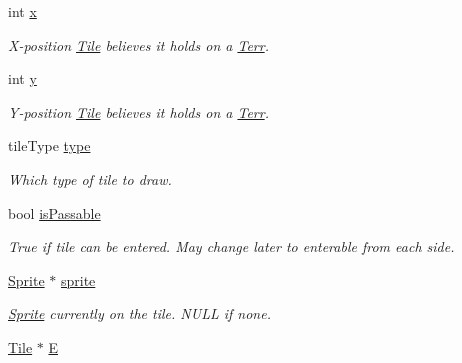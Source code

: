 \begin{DoxyCompactItemize}
\item 
int \hyperlink{class_tile_a47b5eb2072d4b1978923a480043899c9}{x}\hypertarget{class_tile_a47b5eb2072d4b1978923a480043899c9}{}\label{class_tile_a47b5eb2072d4b1978923a480043899c9}

\begin{DoxyCompactList}\small\item\em X-\/position \hyperlink{class_tile}{Tile} believes it holds on a \hyperlink{class_terr}{Terr}. \end{DoxyCompactList}\item 
int \hyperlink{class_tile_a2d87d8813151af6bbd60811964f047a8}{y}\hypertarget{class_tile_a2d87d8813151af6bbd60811964f047a8}{}\label{class_tile_a2d87d8813151af6bbd60811964f047a8}

\begin{DoxyCompactList}\small\item\em Y-\/position \hyperlink{class_tile}{Tile} believes it holds on a \hyperlink{class_terr}{Terr}. \end{DoxyCompactList}\item 
tile\+Type \hyperlink{class_tile_a5aa7ae6350675967edf46400c486a412}{type}\hypertarget{class_tile_a5aa7ae6350675967edf46400c486a412}{}\label{class_tile_a5aa7ae6350675967edf46400c486a412}

\begin{DoxyCompactList}\small\item\em Which type of tile to draw. \end{DoxyCompactList}\item 
bool \hyperlink{class_tile_afa72b458d549b9533f058e2d2fad0f81}{is\+Passable}\hypertarget{class_tile_afa72b458d549b9533f058e2d2fad0f81}{}\label{class_tile_afa72b458d549b9533f058e2d2fad0f81}

\begin{DoxyCompactList}\small\item\em True if tile can be entered. May change later to enterable from each side. \end{DoxyCompactList}\item 
\hyperlink{class_sprite}{Sprite} $\ast$ \hyperlink{class_tile_af768c5b838f49de5d626880c88b3d515}{sprite}\hypertarget{class_tile_af768c5b838f49de5d626880c88b3d515}{}\label{class_tile_af768c5b838f49de5d626880c88b3d515}

\begin{DoxyCompactList}\small\item\em \hyperlink{class_sprite}{Sprite} currently on the tile. N\+U\+LL if none. \end{DoxyCompactList}\item 
\hyperlink{class_tile}{Tile} $\ast$ \hyperlink{class_tile_a0d63c88d4136aecedcb2756d20615b89}{E}\hypertarget{class_tile_a0d63c88d4136aecedcb2756d20615b89}{}\label{class_tile_a0d63c88d4136aecedcb2756d20615b89}


\end{DoxyCompactItemize}
